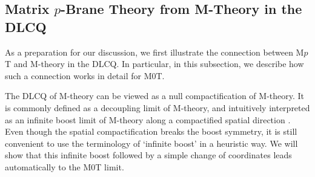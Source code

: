 \documentclass[11pt]{article}
\begin{document}
\subsection{Matrix \texorpdfstring{$p$}{p}-Brane Theory from M-Theory in the DLCQ} \label{sec:mptmtd}

As a preparation for our discussion, we first illustrate the connection between M$p$T and M-theory in the DLCQ. In particular, in this subsection, we describe how such a connection works in detail for M$0$T.

The DLCQ of M-theory can be viewed as a null compactification of M-theory. 
It is commonly defined as a decoupling limit of M-theory, and intuitively interpreted as an infinite boost limit of M-theory along a compactified spatial direction \cite{Seiberg:1997ad}. Even though the spatial compactification breaks the boost symmetry, it is still convenient to use the terminology of `infinite boost' in a heuristic way.
We will show that this infinite boost followed by a simple change of coordinates \cite{Bilal:1998vq} leads automatically to the M0T limit.
\end{document}
